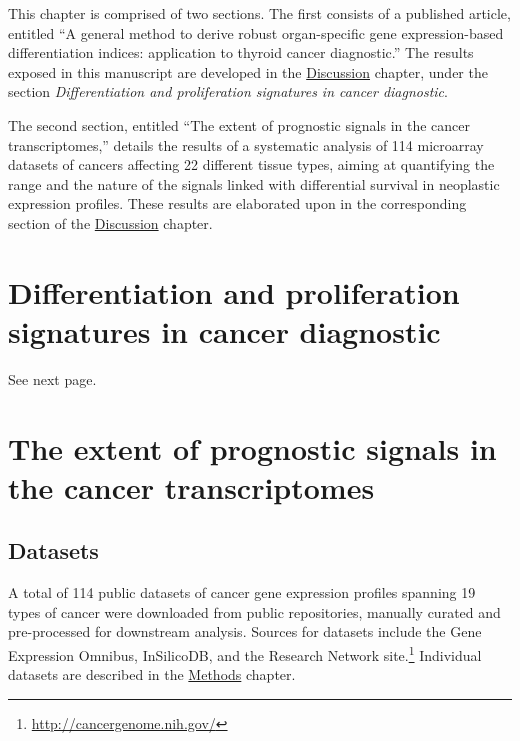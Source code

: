 This chapter is comprised of two sections.  The first consists of a published
article, entitled ``A general method to derive robust organ-specific gene
expression-based differentiation indices: application to thyroid cancer
diagnostic.''\cite{tomas_general_2012} The results exposed in this manuscript
are developed in the
\hyperref[discussion-differentiation-microarrays]{\textsf{Discussion}} chapter,
under the section \emph{Differentiation and proliferation signatures in cancer
  diagnostic}.

The second section, entitled ``The extent of prognostic signals in the cancer
transcriptomes,'' details the results of a systematic analysis of 114 microarray
datasets of cancers affecting 22 different tissue types, aiming at quantifying
the range and the nature of the signals linked with differential survival in
neoplastic expression profiles.  These results are elaborated upon in the
corresponding section of the
\hyperref[sec:discussion-prognostic-microarrays]{\textsf{Discussion}} chapter.



\section{Differentiation and proliferation signatures in cancer diagnostic}
\label{sec:results-differentiation-proliferation}

See next page.

% 


\section{The extent of prognostic signals in the cancer transcriptomes}
\label{sec:results-prognostic-survival}

\subsection{Datasets}
\label{sec:results-prognostic-survival-datasets}

A total of 114 public datasets of cancer gene expression profiles spanning 19
types of cancer were downloaded from public repositories, manually curated and
pre-processed for downstream analysis.  Sources for datasets include the Gene
Expression Omnibus,\cite{edgar_gene_2002}
InSilicoDB,\cite{taminau_insilicodb:_2011} and the  Research
Network
site.\footnote{\href{http://cancergenome.nih.gov/}{http://cancergenome.nih.gov/}}
Individual datasets are described in the
\hyperref[sec:methods-datasets]{\textsf{Methods}} chapter.


